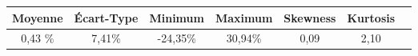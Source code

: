 \begin{tabular}{ccccccc}
    \toprule
    Moyenne & Écart-Type & Minimum & Maximum & Skewness & Kurtosis \\
    \midrule
    0,43 \% & 7,41\% & -24,35\%  & 30,94\% & 0,09 & 2,10 \\
    \bottomrule
\end{tabular}